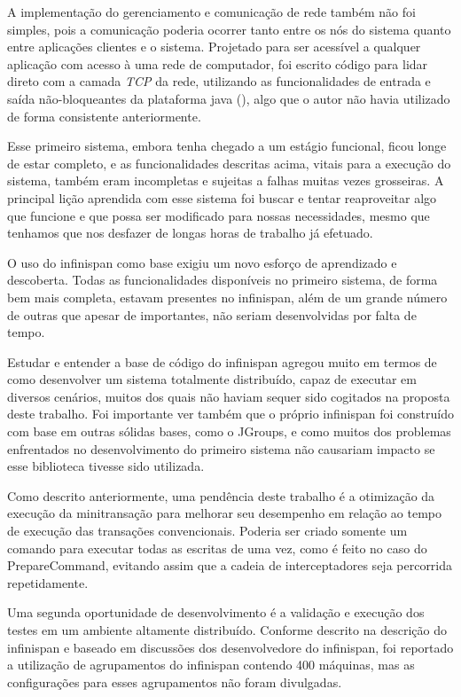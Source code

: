 \documentclass[11pt,twoside,a4paper]{book}
\begin{document}
A implementação do gerenciamento e comunicação de rede também não foi simples, pois a comunicação poderia ocorrer tanto entre os nós do sistema quanto entre aplicações clientes e o sistema. Projetado para ser acessível a qualquer aplicação com acesso à uma rede de computador, foi escrito código para lidar direto com a camada \emph{TCP} da rede, utilizando as funcionalidades de entrada e saída não-bloqueantes da plataforma java (\cite{nio}), algo que o autor não havia utilizado de forma consistente anteriormente.

Esse primeiro sistema, embora tenha chegado a um estágio funcional, ficou longe de estar completo, e as funcionalidades descritas acima, vitais para a execução do sistema, também eram incompletas e sujeitas a falhas muitas vezes grosseiras. A principal lição aprendida com esse sistema foi buscar e tentar reaproveitar algo que funcione e que possa ser modificado para nossas necessidades, mesmo que tenhamos que nos desfazer de longas horas de trabalho já efetuado.

O uso do infinispan como base exigiu um novo esforço de aprendizado e descoberta. Todas as funcionalidades disponíveis no primeiro sistema, de forma bem mais completa, estavam presentes no infinispan, além de um grande número de outras que apesar de importantes, não seriam desenvolvidas por falta de tempo.

Estudar e entender a base de código do infinispan agregou muito em termos de como desenvolver um sistema totalmente distribuído, capaz de executar em diversos cenários, muitos dos quais não haviam sequer sido cogitados na proposta deste trabalho. Foi importante ver também que o próprio infinispan foi construído com base em outras sólidas bases, como o JGroups, e como muitos dos problemas enfrentados no desenvolvimento do primeiro sistema não causariam impacto se esse biblioteca tivesse sido utilizada.

Como descrito anteriormente, uma pendência deste trabalho é a otimização da execução da minitransação para melhorar seu desempenho em relação ao tempo de execução das transações convencionais. Poderia ser criado somente um comando para executar todas as escritas de uma vez, como é feito no caso do PrepareCommand, evitando assim que a cadeia de interceptadores seja percorrida repetidamente.

Uma segunda oportunidade de desenvolvimento é a validação e execução dos testes em um ambiente altamente distribuído. Conforme descrito na descrição do infinispan e baseado em discussões dos desenvolvedore do infinispan, foi reportado a utilização de agrupamentos do infinispan contendo 400 máquinas, mas as configurações para esses agrupamentos não foram divulgadas. 
\end{document}
